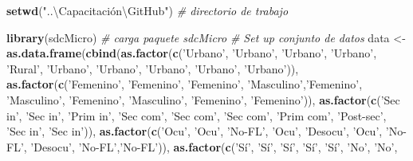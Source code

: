 \documentclass[]{book}
\newenvironment{Shaded}{\begin{snugshade}}{\end{snugshade}}
\newcommand{\CommentTok}[1]{\textcolor[rgb]{0.56,0.35,0.01}{\textit{#1}}}
\newcommand{\KeywordTok}[1]{\textcolor[rgb]{0.13,0.29,0.53}{\textbf{#1}}}
\newcommand{\NormalTok}[1]{#1}
\newcommand{\StringTok}[1]{\textcolor[rgb]{0.31,0.60,0.02}{#1}}
\theoremstyle{definition}
\theoremstyle{definition}
\theoremstyle{definition}
\theoremstyle{definition}
\theoremstyle{remark}
\begin{document}
\begin{Shaded}
\begin{Highlighting}[]
\KeywordTok{setwd}\NormalTok{(}\StringTok{"..\textbackslash{}Capacitación\textbackslash{}GitHub"}\NormalTok{) }\CommentTok{# directorio de trabajo}

\KeywordTok{library}\NormalTok{(sdcMicro) }\CommentTok{# carga paquete sdcMicro}
\CommentTok{# Set up conjunto de datos}
\NormalTok{data <-}\StringTok{ }\KeywordTok{as.data.frame}\NormalTok{(}\KeywordTok{cbind}\NormalTok{(}\KeywordTok{as.factor}\NormalTok{(}\KeywordTok{c}\NormalTok{(}\StringTok{'Urbano'}\NormalTok{, }\StringTok{'Urbano'}\NormalTok{, }\StringTok{'Urbano'}\NormalTok{, }\StringTok{'Urbano'}\NormalTok{,}
                                        \StringTok{'Rural'}\NormalTok{, }\StringTok{'Urbano'}\NormalTok{, }\StringTok{'Urbano'}\NormalTok{, }\StringTok{'Urbano'}\NormalTok{,}
                                        \StringTok{'Urbano'}\NormalTok{, }\StringTok{'Urbano'}\NormalTok{)),}
                            \KeywordTok{as.factor}\NormalTok{(}\KeywordTok{c}\NormalTok{(}\StringTok{'Femenino'}\NormalTok{, }\StringTok{'Femenino'}\NormalTok{, }\StringTok{'Femenino'}\NormalTok{,}
                                        \StringTok{'Masculino'}\NormalTok{,}\StringTok{'Femenino'}\NormalTok{, }\StringTok{'Masculino'}\NormalTok{,}
                                        \StringTok{'Femenino'}\NormalTok{, }\StringTok{'Masculino'}\NormalTok{, }\StringTok{'Femenino'}\NormalTok{,}
                                        \StringTok{'Femenino'}\NormalTok{)),}
                            \KeywordTok{as.factor}\NormalTok{(}\KeywordTok{c}\NormalTok{(}\StringTok{'Sec in'}\NormalTok{, }\StringTok{'Sec in'}\NormalTok{, }\StringTok{'Prim in'}\NormalTok{, }\StringTok{'Sec com'}\NormalTok{,}
                                        \StringTok{'Sec com'}\NormalTok{, }\StringTok{'Sec com'}\NormalTok{, }\StringTok{'Prim com'}\NormalTok{, }\StringTok{'Post-sec'}\NormalTok{,}
                                        \StringTok{'Sec in'}\NormalTok{, }\StringTok{'Sec in'}\NormalTok{)),}
                            \KeywordTok{as.factor}\NormalTok{(}\KeywordTok{c}\NormalTok{(}\StringTok{'Ocu'}\NormalTok{, }\StringTok{'Ocu'}\NormalTok{, }\StringTok{'No-FL'}\NormalTok{, }\StringTok{'Ocu'}\NormalTok{, }\StringTok{'Desocu'}\NormalTok{, }\StringTok{'Ocu'}\NormalTok{,}
                                        \StringTok{'No-FL'}\NormalTok{, }\StringTok{'Desocu'}\NormalTok{, }\StringTok{'No-FL'}\NormalTok{,}\StringTok{'No-FL'}\NormalTok{)),}
                            \KeywordTok{as.factor}\NormalTok{(}\KeywordTok{c}\NormalTok{(}\StringTok{'Sí'}\NormalTok{, }\StringTok{'Sí'}\NormalTok{, }\StringTok{'Sí'}\NormalTok{, }\StringTok{'Sí'}\NormalTok{, }\StringTok{'Sí'}\NormalTok{, }\StringTok{'No'}\NormalTok{, }\StringTok{'No'}\NormalTok{,}

\end{Highlighting}
\end{Shaded}
\end{document}
